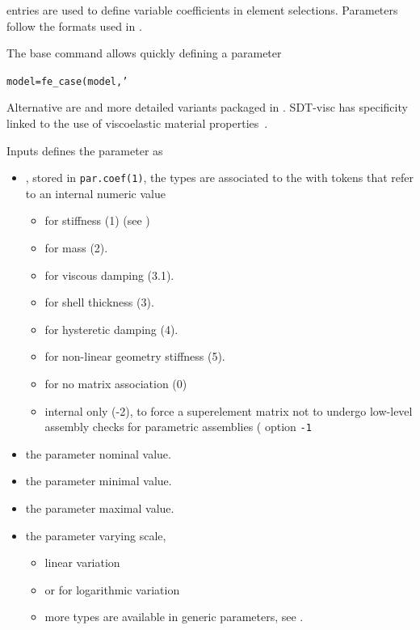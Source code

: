 
 entries are used to define variable coefficients in element selections. Parameters follow the formats used in .

The base command  allows quickly defining a parameter

{\tt model=fe\_case(model,'}

Alternative are  and more detailed variants packaged in . SDT-visc has specificity linked to the use of viscoelastic material properties~\cite{bal43}. 

Inputs defines the parameter as
\begin{itemize}
\item {}, stored in {\tt par.coef(1)}, the types are associated to the  with tokens that refer to an internal numeric value
\begin{itemize}
\item {} for stiffness (1) (see )
\item {} for mass (2).
\item {} for viscous damping (3.1).
\item {} for shell thickness (3).
\item {} for hysteretic damping (4).
\item {} for non-linear geometry stiffness (5).
\item {} for no matrix association (0)
\item {} internal only (-2), to force a superelement matrix not to undergo low-level assembly checks for parametric assemblies ( option {\tt -1}
\end{itemize}
\item {} the parameter nominal value.
\item {} the parameter minimal value.
\item {} the parameter maximal value.
\item {} the parameter varying scale,
\begin{itemize}
\item {} linear variation
\item {} or  for logarithmic variation
\item more types are available in generic parameters, see .

\end{itemize}
\end{itemize}
